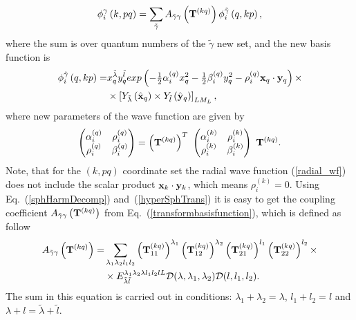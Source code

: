 \documentclass[
12pt, %
oneside, %
english, %
onehalfspacing, %
onehalfspacing, %
headsepline, %
]{MastersDoctoralThesis} %
\begin{document}
  \begin{equation}
 \label{transformbasisfunction}
 \phi_{i}^{\gamma}\left(k, pq \right) = \sum_{\tilde{\gamma}} A_{\tilde{\gamma}\gamma}\left( {\bf T}^{(kq)} \right)
  \phi_{i}^{\tilde{\gamma} } \left(q, kp \right) ,
 \end{equation}
where the sum is over quantum numbers of the $ \tilde {\gamma} $ new set, and the new basis function is
\begin{align}
\phi_{i}^{\tilde{\gamma} } \left(q, kp \right)  =  &
 x_{q}^{\tilde{\lambda}} y_{q}^{\tilde{l}} exp\left(- \tfrac{1}{2} \alpha^{(q)}_{i} x_{q}^{2} - \tfrac{1}{2} \beta^{(q)}_{i}  y_{q}^{2} - \rho^{(q)}_i {\bf x}_{q} \cdot {\bf y}_{q}  \right) 
\times  \nonumber \\ 
&\times  \left[ Y_{\tilde{\lambda}} \left(  \hat{ \bf x}_q \right) \times Y_{\tilde{l}} \left( \hat{\bf y}_q \right) \right]_{LM_L},
\label{newBasis}
\end{align}
where new parameters of the wave function are given by
\begin{align}
\begin{pmatrix}
\alpha_i^{(q)} & \rho_i^{(q)} \\ 
\rho_i^{(q)} & \beta_i^{(q)}
\end{pmatrix}  = \left( {\bf T}^{(kq)} \right)^{T}  ~
\begin{pmatrix}
\alpha_i^{(k)} & \rho_i^{(k)} \\ 
\rho_i^{(k)} & \beta_i^{(k)}
\end{pmatrix} ~  {\bf T}^{(kq)}.
\end{align}
Note, that for the $(k,pq)$ coordinate set the radial wave function (\ref{radial_wf}) does not include the scalar product ${\bf x}_k \cdot {\bf y}_k$, which means $\rho_i^{(k)}=0$.  
 Using Eq.~(\ref{sphHarmDecomp}) and~(\ref{hyperSphTrans}) it is easy to get the coupling coefficient $ A_{\tilde{\gamma} \gamma} \left( {\bf T}^{(kq)} \right) $ from Eq.~(\ref{transformbasisfunction}), which is defined as follow 
 \begin{align}
A_{\tilde{\gamma}\gamma}\left( {\bf T}^{(kq)} \right) = & \sum_{\lambda_1 \lambda_2 l_1 l_2} 
\left({\bf T}_{11}^{(kq)} \right)^{\lambda_1} 
\left({\bf T}_{12}^{(kq)} \right)^{\lambda_2} 
\left({\bf T}_{21}^{(kq)} \right)^{l_1} 
\left({\bf T}_{22}^{(kq)} \right)^{l_2} 
\times \nonumber
\\
& \times {E}^{\lambda_1 \lambda_2 \lambda l_1 l_2 l L}_{\tilde{\lambda} \tilde{l} } \mathcal{D}(\lambda,\lambda_1,\lambda_2) \mathcal{D}(l,l_1,l_2).    
\label{trans_coef}
\end{align}
The sum in this equation is carried out in conditions: $\lambda_1+\lambda_2=\lambda$, $l_1+l_2=l$ and $\lambda+l=\tilde{\lambda}+\tilde{l}$.
\end{document}
